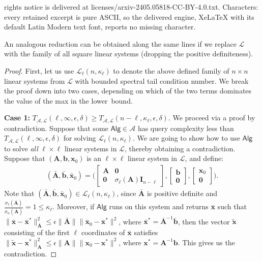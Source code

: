 \documentclass[10pt,a4paper]{amsart}
\def\Ac{{\mathcal A}}
\def\Alg{{\mathsf{Alg}}}
\def\A{{\mathbf A}}
\def\I{{\mathbf I}}
\def\Lc{{\mathcal L}}
\def\b{{\mathbf b}}
\def\x{{\mathbf x}}
\def\zero{{\mathbf 0}}
\begin{document}
rights notice is delivered at licenses/arxiv-2405.05818-CC-BY-4.0.txt. Characters: every retained excerpt is pure ASCII, so the delivered engine, XeLaTeX with its default Latin Modern text font, reports no missing character.
  \begin{remark}
    An analogous reduction can be obtained along the same lines if we replace $\Lc$ with the family of all square linear systems (dropping the positive definiteness).
  \end{remark}

\begin{proof}
First, let us use $\Lc_\ell(n,\kappa_\ell)$ to denote the above defined family of $n\times n$ linear systems from $\Lc$ with bounded spectral tail condition number. We break the proof down into two cases, depending on which of the two terms dominates the value of the max in the lower~bound.
\smallskip

\noindent    
\textbf{Case 1:}  $T_{\Ac,\Lc}(\ell,\infty,\epsilon,\delta) \geq T_{\Ac,\Lc}(n-\ell,\kappa_\ell,\epsilon,\delta)$. We  proceed via a proof by contradiction. Suppose that some $\Alg\in\Ac$ has query complexity less than $T_{\Ac,\Lc}(\ell,\infty,\epsilon,\delta)$ for solving $\Lc_\ell(n,\kappa_\ell)$. We are going to show how to use $\Alg$ to solve \emph{all} $\ell\times \ell$ linear systems in $\Lc$, thereby obtaining a contradiction. Suppose that $(\A,\b,\x_0)$ is an $\ell\times \ell$ linear system in $\Lc$, and define:
\begin{align*}
(\bar\A,\bar\b,\bar\x_0)=\bigg(\begin{bmatrix}
    \A&\zero\\
    \zero& \sigma_{\ell}(\A)\I_{n-\ell}
\end{bmatrix}, 
\begin{bmatrix}
    \b\\ 
    \zero
\end{bmatrix},
\begin{bmatrix}
    \x_0\\ 
    \zero
\end{bmatrix}
\bigg).
\end{align*}
Note that $(\bar\A,\bar\b,\bar\x_0)\in\Lc_\ell(n,\kappa_\ell)$, since $\bar\A$ is positive definite and $\frac{\sigma_{\ell}(\bar\A)}{\sigma_n(\bar\A)}=1\leq\kappa_\ell$. Moreover, if $\Alg$ runs on this system and returns $\bar\x$ such that $\|\bar\x-\bar\x^*\|_{\bar\A}^2\leq\epsilon\|\bar\A\|\|\bar\x_0-\bar\x^*\|^2$, where $\bar\x^*=\bar\A^{-1}\bar\b$, then the vector $\tilde\x$ consisting of the first $\ell$ coordinates of $\bar\x$ satisfies $\|\tilde\x-\x^*\|_{\A}^2\leq\epsilon\|\A\|\|\x_0-\x^*\|^2$, where $\x^*=\A^{-1}\b$. This gives us the contradiction.
\smallskip


\end{proof}
\end{document}
